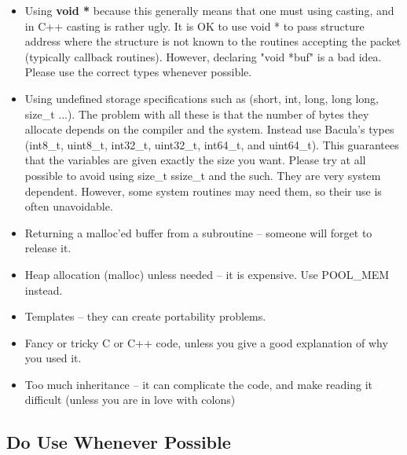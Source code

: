 \begin{itemize}
\item Using {\bf void *} because this generally means that one must
   using casting, and in C++ casting is rather ugly.  It is OK to use
   void * to pass structure address where the structure is not known  
   to the routines accepting the packet (typically callback routines).
   However, declaring "void *buf" is a bad idea.  Please use the
   correct types whenever possible.

\item Using undefined storage specifications such as (short, int, long,
   long long, size\_t ...).  The problem with all these is that the number of bytes
   they allocate depends on the compiler and the system.  Instead use
   Bacula's types (int8\_t, uint8\_t, int32\_t, uint32\_t, int64\_t, and 
   uint64\_t).  This guarantees that the variables are given exactly the
   size you want. Please try at all possible to avoid using size\_t ssize\_t
   and the such. They are very system dependent.  However, some system
   routines may need them, so their use is often unavoidable.

\item Returning a malloc'ed buffer from a subroutine --  someone will forget
   to release it. 

\item Heap allocation (malloc) unless needed -- it is expensive. Use
      POOL\_MEM instead.

\item Templates -- they can create portability problems. 

\item Fancy or tricky C or C++ code, unless you give a  good explanation of
   why you used it. 

\item Too much inheritance -- it can complicate the code,  and make reading it
   difficult (unless you are in love  with colons) 

\end{itemize}

\subsection{Do Use Whenever Possible}

